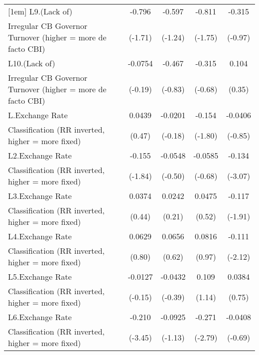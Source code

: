 {\begin{tabular}{l*{4}{c}}
[1em]
L9.(Lack of)        &      -0.796         &      -0.597         &      -0.811         &      -0.315         \\
Irregular CB Governor Turnover (higher = more de facto CBI)&     (-1.71)         &     (-1.24)         &     (-1.75)         &     (-0.97)         \\
[1em]
L10.(Lack of)       &     -0.0754         &      -0.467         &      -0.315         &       0.104         \\
Irregular CB Governor Turnover (higher = more de facto CBI)&     (-0.19)         &     (-0.83)         &     (-0.68)         &      (0.35)         \\
[1em]
L.Exchange Rate     &      0.0439         &     -0.0201         &      -0.154         &     -0.0406         \\
Classification (RR inverted, higher = more fixed)&      (0.47)         &     (-0.18)         &     (-1.80)         &     (-0.85)         \\
[1em]
L2.Exchange Rate    &      -0.155         &     -0.0548         &     -0.0585         &      -0.134\sym{**} \\
Classification (RR inverted, higher = more fixed)&     (-1.84)         &     (-0.50)         &     (-0.68)         &     (-3.07)         \\
[1em]
L3.Exchange Rate    &      0.0374         &      0.0242         &      0.0475         &      -0.117         \\
Classification (RR inverted, higher = more fixed)&      (0.44)         &      (0.21)         &      (0.52)         &     (-1.91)         \\
[1em]
L4.Exchange Rate    &      0.0629         &      0.0656         &      0.0816         &      -0.111\sym{*}  \\
Classification (RR inverted, higher = more fixed)&      (0.80)         &      (0.62)         &      (0.97)         &     (-2.12)         \\
[1em]
L5.Exchange Rate    &     -0.0127         &     -0.0432         &       0.109         &      0.0384         \\
Classification (RR inverted, higher = more fixed)&     (-0.15)         &     (-0.39)         &      (1.14)         &      (0.75)         \\
[1em]
L6.Exchange Rate    &      -0.210\sym{***}&     -0.0925         &      -0.271\sym{**} &     -0.0408         \\
Classification (RR inverted, higher = more fixed)&     (-3.45)         &     (-1.13)         &     (-2.79)         &     (-0.69)         \\

\end{tabular}}
